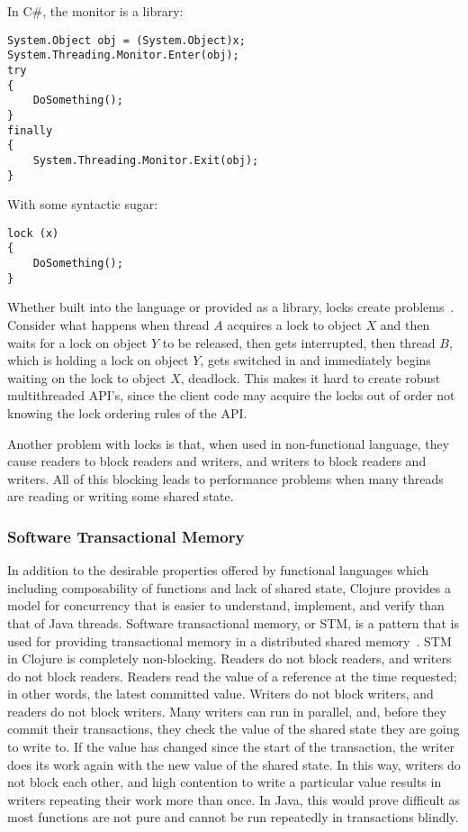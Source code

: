 In C\#, the monitor is a library:
 
\lstset{language=Java}
\begin{lstlisting}
System.Object obj = (System.Object)x;
System.Threading.Monitor.Enter(obj);
try
{
    DoSomething();
}
finally
{
    System.Threading.Monitor.Exit(obj);
} 
\end{lstlisting}

With some syntactic sugar:

\lstset{language=Java}
\begin{lstlisting}
lock (x)
{
    DoSomething();
}
\end{lstlisting}

Whether built into the language or provided as a library, locks create problems~\cite{problemsWithThreads}.
Consider what happens when thread $A$ acquires a lock to object $X$ and then waits for
a lock on object $Y$ to be released, then gets interrupted, then thread $B$, which is holding a lock
on object $Y$, gets switched in and immediately begins waiting on the lock to object $X$, deadlock.
This makes it hard to create robust multithreaded API's, since the client code may acquire the locks out of order not
knowing the lock ordering rules of the API. 

Another problem with locks is that, when used in non-functional language, they cause 
readers to block readers and writers, and writers to block readers and
writers. 
All of this blocking leads to performance problems when many threads
are reading or writing some shared state.


\subsubsection{Software Transactional Memory}
In addition to the desirable properties offered by functional languages which including composability of functions and lack of shared state, Clojure provides a model for concurrency that is easier to understand, implement, and verify than that of Java threads.
Software transactional memory, or STM, is a pattern that is used for
providing transactional memory in a distributed shared
memory~\cite{stm}. 
STM in Clojure is completely non-blocking. 
Readers do not block readers, and writers do not block readers. 
Readers read the value of a reference at the time requested; in other
words, the latest committed value. 
Writers do not block writers, and readers do not block writers. 
Many writers can run in parallel, and, before they commit their
transactions, they check the value of the shared state they
are going to write to. 
If the value has changed since the start of the transaction, the
writer does its work again with the new value of the shared state. 
In this way, writers do not block each other, and high contention to
write a particular value results in writers repeating their work more
than once. 
In Java, this would prove difficult as most functions are not pure and cannot be run repeatedly in transactions blindly. 

